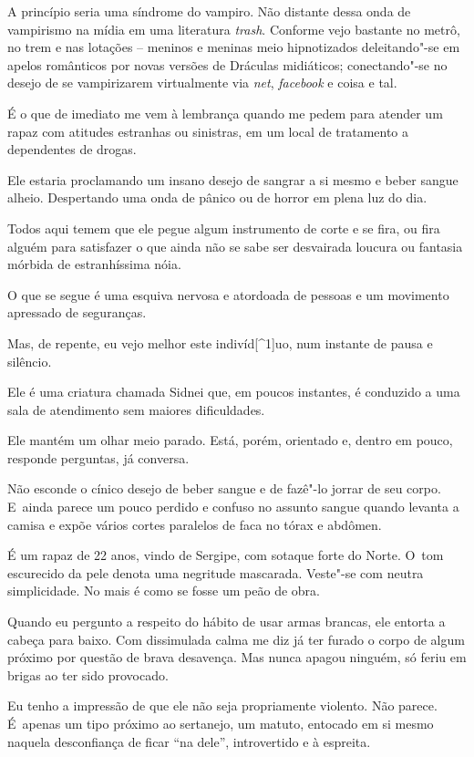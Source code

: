  

A princípio seria uma síndrome do vampiro. Não distante dessa onda de
vampirismo na mídia em uma literatura \emph{trash}. Conforme vejo
bastante no metrô, no trem e nas lotações -- meninos e meninas meio
hipnotizados deleitando"-se em apelos românticos por novas versões de
Dráculas midiáticos; conectando"-se no desejo de se vampirizarem
virtualmente via \emph{net}, \emph{facebook} e coisa e tal.

É o que de imediato me vem à lembrança quando me pedem para atender um
rapaz com atitudes estranhas ou sinistras, em um local de tratamento a
dependentes de drogas.

Ele estaria proclamando um insano desejo de sangrar a si mesmo e beber
sangue alheio. Despertando uma onda de pânico ou de horror em plena luz
do dia.

Todos aqui temem que ele pegue algum instrumento de corte e se fira, ou
fira alguém para satisfazer o que ainda não se sabe ser desvairada
loucura ou fantasia mórbida de estranhíssima nóia.

O que se segue é uma esquiva nervosa e atordoada de pessoas e um
movimento apressado de seguranças.

Mas, de repente, eu vejo melhor este indivíd[^1]uo, num instante de pausa e
silêncio.

Ele é uma criatura chamada Sidnei que, em poucos instantes, é conduzido
a uma sala de atendimento sem maiores dificuldades.

Ele mantém um olhar meio parado. Está, porém, orientado e, dentro em
pouco, responde perguntas, já conversa.

Não esconde o cínico desejo de beber sangue e de fazê"-lo jorrar de seu
corpo. E~ainda parece um pouco perdido e confuso no assunto sangue
quando levanta a camisa e expõe vários cortes paralelos de faca no tórax
e abdômen.

É um rapaz de 22 anos, vindo de Sergipe, com sotaque forte do Norte. O~tom escurecido da pele denota uma negritude mascarada. Veste"-se com
neutra simplicidade. No mais é como se fosse um peão de obra.

Quando eu pergunto a respeito do hábito de usar armas brancas, ele
entorta a cabeça para baixo. Com dissimulada calma me diz já ter furado
o corpo de algum próximo por questão de brava desavença. Mas nunca
apagou ninguém, só feriu em brigas ao ter sido provocado.

Eu tenho a impressão de que ele não seja propriamente violento. Não
parece. É~apenas um tipo próximo ao sertanejo, um matuto, entocado em si
mesmo naquela desconfiança de ficar ``na dele'', introvertido e à
espreita.

